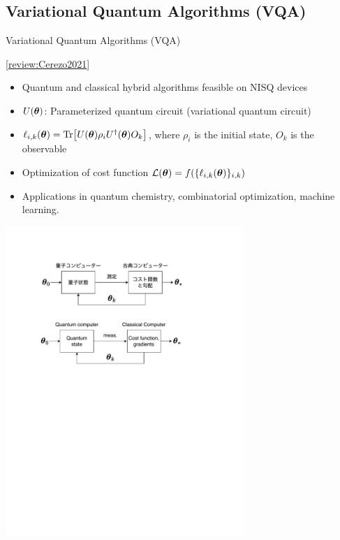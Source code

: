 \documentclass[dvipdfmx,10pt,aspectratio=169]{beamer}
\begin{document}
\newcommand{\tabitem}{\usebeamertemplate{itemize item}\hspace*{\labelsep}}
\subsection{Variational Quantum Algorithms (VQA)}
\begin{frame}{Variational Quantum Algorithms (VQA)}
    \vspace*{-5pt}
    \begin{center}
        {\large\colorbox{blue!40}{ {\small[\href{http://arxiv.org/abs/2012.09265}{review:Cerezo2021}]} }}
    \end{center}

    \begin{center}
        \begin{minipage}{1\textwidth}
            \begin{itemize}
                \item Quantum and classical hybrid algorithms feasible on NISQ devices
                \item $U(\vb*{\theta})$: Parameterized quantum circuit (variational quantum circuit)
                \item $\ell_{i,k}(\vb*{\theta}) = \Tr[U(\vb*{\theta})\rho_i U^\dagger(\vb*{\theta})O_k]$, where $\rho_i$ is the initial state, $O_k$ is the observable
                \item Optimization of cost function $\mathcal{L}(\vb*{\theta}) = f(\{\ell_{i,k}(\vb*{\theta})\}_{i,k})$
                \item Applications in quantum chemistry, combinatorial optimization, machine learning.
            \end{itemize}
        \end{minipage}
    \end{center}

    \centering\includegraphics[width=9cm]{vqa-flow-en.pdf}
\end{frame}
\end{document}
